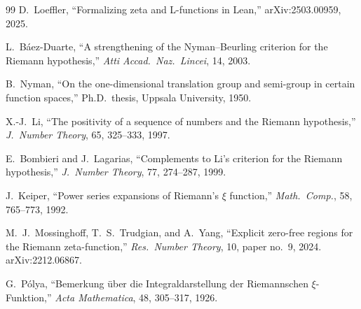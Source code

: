 \documentclass[11pt]{article}
\begin{document}
\begin{thebibliography}{99}
D.~Loeffler, ``Formalizing zeta and L-functions in Lean,''
arXiv:2503.00959, 2025.

L.~B\'aez-Duarte, ``A strengthening of the Nyman--Beurling criterion for the Riemann hypothesis,''
\textit{Atti Accad.\ Naz.\ Lincei}, 14, 2003.

B.~Nyman, ``On the one-dimensional translation group and semi-group in certain function spaces,''
Ph.D.\ thesis, Uppsala University, 1950.

X.-J.~Li, ``The positivity of a sequence of numbers and the Riemann hypothesis,''
\textit{J.\ Number Theory}, 65, 325--333, 1997.

E.~Bombieri and J.~Lagarias,
``Complements to Li's criterion for the Riemann hypothesis,''
\textit{J.\ Number Theory}, 77, 274--287, 1999.

J.~Keiper,
``Power series expansions of Riemann's $\xi$ function,''
\textit{Math.\ Comp.}, 58, 765--773, 1992.

M.~J.~Mossinghoff, T.~S.~Trudgian, and A.~Yang,
``Explicit zero-free regions for the Riemann zeta-function,''
\textit{Res.\ Number Theory}, 10, paper no.\ 9, 2024.
arXiv:2212.06867.

G.~P\'olya,
``Bemerkung \"uber die Integraldarstellung der Riemannschen $\xi$-Funktion,''
\textit{Acta Mathematica}, 48, 305--317, 1926.

\end{thebibliography}
\end{document}
